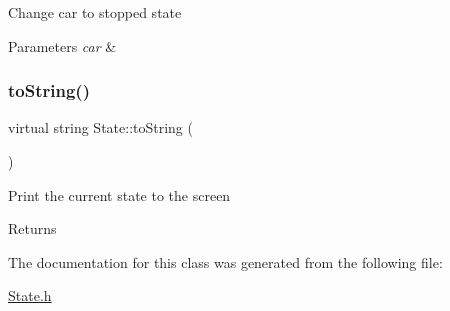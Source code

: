 Change car to stopped state 
\begin{DoxyParams}{Parameters}
{\em car} & \\
\hline
\end{DoxyParams}
\mbox{\label{class_state_afabc279037b4526ec161e6f8988855a9}} 
\subsubsection{\texorpdfstring{to\+String()}{toString()}}
{\footnotesize\ttfamily virtual string State\+::to\+String (\begin{DoxyParamCaption}{ }\end{DoxyParamCaption})\hspace{0.3cm}{\ttfamily [pure virtual]}}

Print the current state to the screen \begin{DoxyReturn}{Returns}

\end{DoxyReturn}


The documentation for this class was generated from the following file\+:\begin{DoxyCompactItemize}
\item 
\mbox{\hyperlink{_state_8h}{State.\+h}}\end{DoxyCompactItemize}
